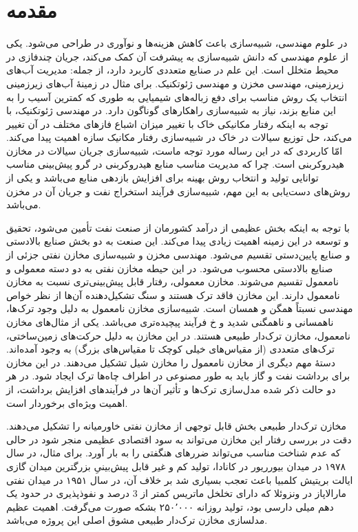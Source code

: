 \chapter{مقدمه}
\label{ch:fasl1}

در  علوم مهندسی، شبیه‌سازی باعث کاهش هزینه‌ها و نوآوری در طراحی می‌شود. یکی از علوم مهندسی که دانش شبیه‌سازی 
به پیشرفت آن کمک می‌کند، جریان چند‌فازی در محیط متخلل است. این علم در صنایع متعددی کاربرد دارد، از جمله: مدیریت آب‌های
 زیرزمینی، مهندسی مخزن و مهندسی ژئوتکنیک. برای مثال در زمینهٔ آب‌های زیرزمینی انتخاب یک روش مناسب برای دفع زباله‌های 
 شیمیایی به طوری که کمترین آسیب را به این منابع بزند، نیاز به شبیه‌سازی راهکارهای گوناگون دارد. 
 در مهندسی ژئوتکنیک، با توجه به اینکه رفتار مکانیکی خاک با تغییر میزان اشباع فاز‌های مختلف در آن تغییر می‌کند، 
 حل توزیع سیالات در خاک در شبیه‌سازی رفتار مکانیک سازه اهمیت پیدا می‌کند. امّا کاربردی که در این رساله مورد توجه ماست، 
 شبیه‌سازی جریان سیالات در مخازن هیدروکربنی است. چرا که مدیریت مناسب منابع هیدروکربنی در گرو پیش‌بینی مناسب توانایی تولید و 
 انتخاب روش بهینه برای افزایش بازدهی منابع می‌باشد و یکی از روش‌های دست‌یابی به این مهم، شبیه‌سازی فرآیند استخراج نفت و 
 جریان آن در مخزن می‌باشد.

با توجه به اینکه بخش عظیمی از درآمد کشورمان از صنعت نفت تأمین می‌شود، تحقیق و توسعه در این زمینه اهمیت زیادی پیدا می‌کند. این صنعت به دو بخش صنایع بالادستی و صنایع پایین‌دستی تقسیم می‌شود. مهندسی مخزن و شبیه‌سازی مخازن نفتی جزئی از صنایع بالادستی محسوب می‌شود. در این حیطه مخازن نفتی به دو دسته معمولی و نامعمول تقسیم می‌شوند. مخازن معمولی، رفتار قابل پیش‌بینی‌تری نسبت به مخازن نامعمول دارند. این مخازن فاقد ترک هستند و سنگ تشکیل‌دهنده آن‌ها از نظر خواص مهندسی نسبتاً همگن و همسان است. شبیه‌سازی مخازن نامعمول به دلیل وجود ترک‌ها، ناهمسانی و ناهمگنی شدید و ‌خ{} فرآیند پیچیده‌تری می‌باشد. یکی از مثال‌های مخازن نامعمول، مخازن ترک‌دار طبیعی هستند. در این مخازن به دلیل حرکت‌های زمین‌ساختی،  ترک‌های متعددی (از مقیاس‌های خیلی کوچک تا مقیاس‌های بزرگ) به وجود آمده‌اند. دستهٔ مهم دیگری از مخازن نامعمول را مخازن شیل تشکیل می‌دهند. در این مخازن برای برداشت نفت و گاز باید به طور مصنوعی در اطراف چاه‌ها ترک ایجاد شود. در هر دو حالت ذکر شده مدل‌سازی ترک‌ها و تأثیر آن‌ها در فرآیند‌های افزایش برداشت، از اهمیت ویژه‌ای برخوردار است.

 مخازن ترک‌دار طبیعی بخش قابل توجهی از مخازن نفتی خاورمیانه را تشکیل می‌دهند. دقت در بررسی رفتار این مخازن می‌تواند به سود اقتصادی عظیمی منجر شود در حالی که عدم شناخت مناسب می‌تواند ضرر‌های هنگفتی را به بار آورد. برای مثال، در سال ۱۹۷۸ در میدان بیور‌ریور در کانادا، تولید کم و غیر قابل پیش‌بینیِ بزرگترین میدان گازی ایالت بریتیش کلمبیا باعث تعجب بسیاری شد بر خلاف آن، در سال ۱۹۵۱ در میدان نفتی مارالاپاز در ونزوئلا که دارای تخلخل ماتریس کمتر از 3 درصد و نفوذپذیری در حدود یک دهم میلی دارسی بود، تولید روزانه ۲۵۰٬۰۰۰ بشکه صورت می‌گرفت. اهمیت عظیم مدلسازی مخازن ترک‌دار طبیعی مشوق اصلی این پروژه می‌باشد.

